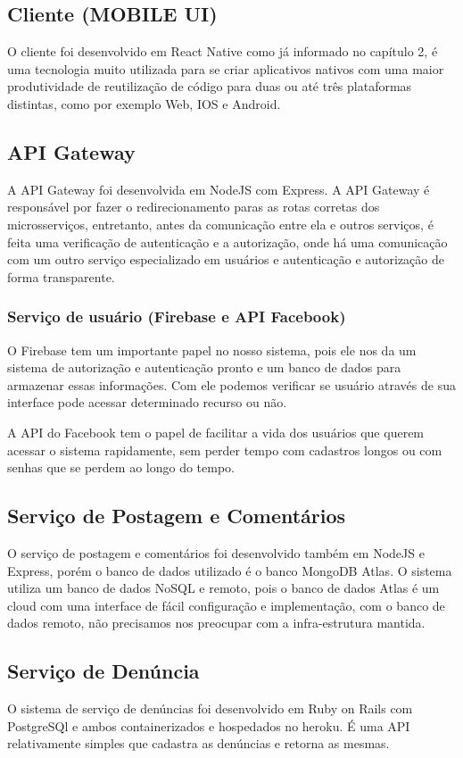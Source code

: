 \subsection{Cliente (MOBILE UI) }

 O cliente foi desenvolvido em React Native como já informado no capítulo 2, é uma tecnologia muito utilizada para se criar aplicativos nativos com uma maior produtividade de reutilização de código para duas ou até três plataformas distintas, como por exemplo Web, IOS e Android.

\subsection{API Gateway}

A API Gateway foi desenvolvida em NodeJS com Express. A API Gateway é responsável por fazer o redirecionamento paras as rotas corretas dos microsserviços, entretanto, antes da comunicação entre ela e outros serviços, é feita uma verificação de autenticação e a autorização, onde há uma comunicação com um outro serviço especializado em usuários e autenticação e autorização de forma transparente.

\subsubsection{Serviço de usuário (Firebase e API Facebook) }

O Firebase tem um importante papel no nosso sistema, pois ele nos da um sistema de autorização e autenticação pronto e um banco de dados para armazenar essas informações. Com ele podemos verificar se usuário através de sua interface pode acessar determinado recurso ou não.

A API do Facebook tem o papel de facilitar a vida dos usuários que querem acessar o sistema rapidamente, sem perder tempo com cadastros longos ou com senhas que se perdem ao longo do tempo.

\subsection{ Serviço de Postagem e Comentários }

O serviço de postagem e comentários foi desenvolvido também em NodeJS e Express, porém o banco de dados utilizado é o banco MongoDB Atlas. O sistema utiliza um banco de dados NoSQL e remoto, pois o banco de dados Atlas é um cloud com uma interface de fácil configuração e implementação, com o banco de dados remoto, não precisamos nos preocupar com a infra-estrutura mantida. 

\subsection{ Serviço de Denúncia }

O sistema de serviço de denúncias foi desenvolvido em Ruby on Rails com PostgreSQl e ambos containerizados e hospedados no heroku. É uma API relativamente simples que cadastra as denúncias e retorna as mesmas.
